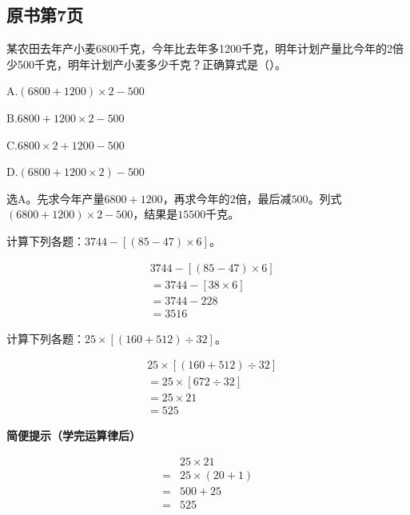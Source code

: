 

\subsection*{原书第7页}

某农田去年产小麦6800千克，今年比去年多1200千克，明年计划产量比今年的2倍少500千克，明年计划产小麦多少千克？正确算式是（\hspace{1.8em}）。\par
\noindent A.\((6800+1200)\times2-500\)\par
\noindent B.\(6800+1200\times2-500\)\par
\noindent C.\(6800\times2+1200-500\)\par
\noindent D.\((6800+1200\times2)-500\)\par
\begin{BookAnswer}
选\(\mathrm A\)。先求今年产量\(6800+1200\)，再求今年的\(2\)倍，最后减\(500\)。列式\((6800+1200)\times2-500\)，结果是\(15500\)千克。
\end{BookAnswer}

计算下列各题：\(3744-[(85-47)\times6]\)。\par
\begin{BookAnswer}
\[\begin{aligned}&3744-[(85-47)\times6]\\&=3744-[38\times6]\\&=3744-228\\&=3516\end{aligned}\]
\end{BookAnswer}

计算下列各题：\(25\times[(160+512)\div32]\)。\par
\begin{BookAnswer}
\[\begin{aligned}&25\times[(160+512)\div32]\\&=25\times[672\div32]\\&=25\times21\\&=525\end{aligned}\]\par\textbf{简便提示（学完运算律后）}\par \[\begin{aligned}&25\times21\\={}&25\times(20+1)\\={}&500+25\\={}&525\end{aligned}\]
\end{BookAnswer}

